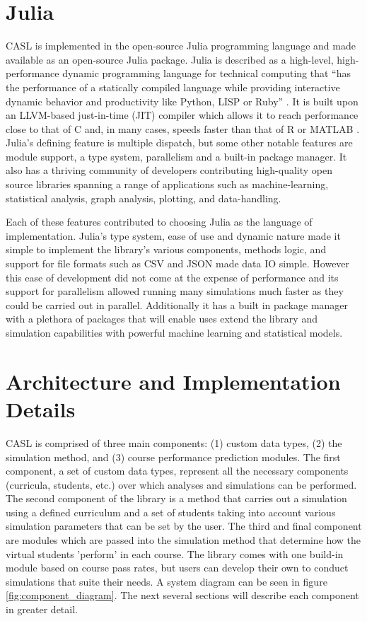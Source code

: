 \documentclass[botnum, fleqn]{unmeethesis}
\begin{document}
  \section{Julia}
    CASL is implemented in the open-source Julia programming language and made available as an open-source Julia package. Julia is described as a high-level, high-performance dynamic programming language for technical computing that ``has the performance of a statically compiled language while providing interactive dynamic behavior and productivity like Python, LISP or Ruby'' \cite{Julia}. It is built upon an LLVM-based just-in-time (JIT) compiler which allows it to reach performance close to that of C and, in many cases, speeds faster than that of R or MATLAB \cite{Julia}. Julia's defining feature is multiple dispatch, but some other notable features are module support, a type system, parallelism and a built-in package manager. It also has a thriving community of developers contributing high-quality open source libraries spanning a range of applications such as machine-learning, statistical analysis, graph analysis, plotting, and data-handling.

    Each of these features contributed to choosing Julia as the language of implementation. Julia's type system, ease of use and dynamic nature made it simple to implement the library's various components, methods logic, and support for file formats such as CSV and JSON made data IO simple. However this ease of development did not come at the expense of performance and its support for parallelism allowed running many simulations much faster as they could be carried out in parallel. Additionally it has a built in package manager with a plethora of packages that will enable uses extend the library and simulation capabilities with powerful machine learning and statistical models.

  
  \section{Architecture and Implementation Details}
    CASL is comprised of three main components: (1) custom data types, (2) the simulation method, and (3) course performance prediction modules. The first component, a set of custom data types, represent all the necessary components (curricula, students, etc.) over which analyses and simulations can be performed. The second component of the library is a method that carries out a simulation using a defined curriculum and a set of students taking into account various simulation parameters that can be set by the user. The third and final component are modules which are passed into the simulation method that determine how the virtual students 'perform' in each course. The library comes with one build-in module based on course pass rates, but users can develop their own to conduct simulations that suite their needs. A system diagram can be seen in figure \ref{fig:component_diagram}. The next several sections will describe each component in greater detail.
\end{document}
